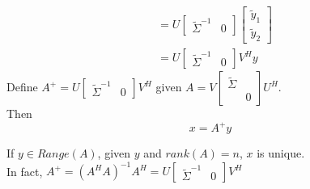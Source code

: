 \begin{multicols}{2}
\[\begin{array}{ll}
        &= U\begin{bmatrix}
            \tilde{\Sigma}^{-1} & 0
        \end{bmatrix} \begin{bmatrix}
            \tilde{y}_1 \\ \tilde{y}_2
        \end{bmatrix} \\
        &= U\begin{bmatrix}
            \tilde{\Sigma}^{-1} & 0
        \end{bmatrix} V^H y
    \end{array}
\]
Define $A^{+}=U\begin{bmatrix}
    \tilde{\Sigma}^{-1} & 0
\end{bmatrix} V^H$ given $A=V\begin{bmatrix}
    \tilde{\Sigma} & \\ & 0
\end{bmatrix}U^H$. \\
Then 
\[
    x = A^{+}y
\]

If $y\in Range(A)$, given $y$ and $rank(A)=n$, $x$ is unique. \\
In fact, $A^{+}=(A^HA)^{-1}A^H=U\begin{bmatrix}
    \tilde{\Sigma}^{-1} & 0
\end{bmatrix} V^H$


\end{multicols}
